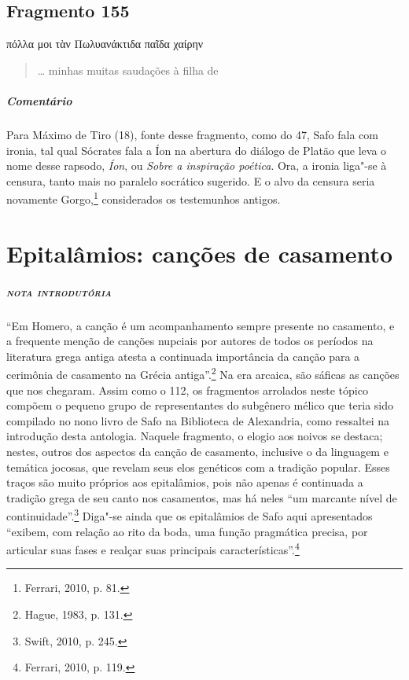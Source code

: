 \section{Fragmento 155}

\begin{gkverse}
πόλλα μοι τὰν Πωλυανάκτιδα παῖδα χαίρην
\end{gkverse}

\begin{verse}
\ldots{} minhas muitas saudações à filha de 
\end{verse}

\medskip

{\paragraph{Comentário} Para Máximo de Tiro (18), fonte desse fragmento, como do 47, Safo fala com ironia, tal qual
Sócrates fala a Íon na abertura do diálogo de Platão que leva o nome desse
rapsodo, \textit{Íon}, ou \textit{Sobre a inspiração poética}. Ora, a ironia
liga"-se à censura, tanto mais no paralelo socrático sugerido.
E o alvo da censura seria novamente Gorgo,\footnote{Ferrari, 2010, p. 81.} considerados os testemunhos antigos.}



\chapter[Epitalâmios: canções de casamento]{Epitalâmios: canções de casamento}

\paragraph{\textsc{nota introdutória}}
``Em Homero, a canção é um acompanhamento sempre presente no casamento, e a frequente menção de canções nupciais por autores de todos os períodos na literatura grega antiga atesta a continuada importância da canção para a cerimônia de casamento na Grécia antiga''.\footnote{Hague, 1983, p. 131.} Na era arcaica, são sáficas as canções que nos chegaram. Assim como o 112, os fragmentos arrolados neste tópico compõem o pequeno grupo
de representantes do subgênero mélico que teria sido compilado no nono livro de
Safo na Biblioteca de Alexandria, como ressaltei na introdução desta antologia.
Naquele fragmento, o elogio aos noivos se destaca; nestes, outros dos aspectos
da canção de casamento, inclusive o da linguagem e temática jocosas, que
revelam seus elos genéticos com a tradição popular.
Esses traços são muito próprios aos epitalâmios, pois não apenas é continuada a tradição grega de seu canto nos casamentos, mas há neles  ``um marcante nível de continuidade''.\footnote{Swift, 2010, p. 245.} Diga"-se ainda que os epitalâmios de Safo aqui apresentados ``exibem, com relação ao rito da boda, uma função pragmática precisa, por articular suas fases e realçar suas principais características''.\footnote{Ferrari, 2010, p. 119.} 

